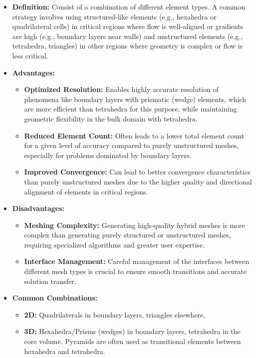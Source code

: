 \documentclass{book}
\begin{document}
\begin{itemize}[leftmargin=*,label=\textbullet]
\begin{itemize}[leftmargin=*,label=\textbullet]
    \item \textbf{Definition:} Consist of a combination of different element types. A common strategy involves using structured-like elements (e.g., hexahedra or quadrilateral cells) in critical regions where flow is well-aligned or gradients are high (e.g., boundary layers near walls) and unstructured elements (e.g., tetrahedra, triangles) in other regions where geometry is complex or flow is less critical.
    \item \textbf{Advantages:}
    \begin{itemize}[leftmargin=*,label=$\circ$]
        \item \textbf{Optimized Resolution:} Enables highly accurate resolution of phenomena like boundary layers with prismatic (wedge) elements, which are more efficient than tetrahedra for this purpose, while maintaining geometric flexibility in the bulk domain with tetrahedra.
        \item \textbf{Reduced Element Count:} Often leads to a lower total element count for a given level of accuracy compared to purely unstructured meshes, especially for problems dominated by boundary layers.
        \item \textbf{Improved Convergence:} Can lead to better convergence characteristics than purely unstructured meshes due to the higher quality and directional alignment of elements in critical regions.
    \end{itemize}
    \item \textbf{Disadvantages:}
    \begin{itemize}[leftmargin=*,label=$\circ$]
        \item \textbf{Meshing Complexity:} Generating high-quality hybrid meshes is more complex than generating purely structured or unstructured meshes, requiring specialized algorithms and greater user expertise.
        \item \textbf{Interface Management:} Careful management of the interfaces between different mesh types is crucial to ensure smooth transitions and accurate solution transfer.
    \end{itemize}
    \item \textbf{Common Combinations:}
    \begin{itemize}[leftmargin=*,label=$\circ$]
        \item \textbf{2D:} Quadrilaterals in boundary layers, triangles elsewhere.
        \item \textbf{3D:} Hexahedra/Prisms (wedges) in boundary layers, tetrahedra in the core volume. Pyramids are often used as transitional elements between hexahedra and tetrahedra.
    \end{itemize}
\end{itemize}


\end{itemize}
\end{document}
